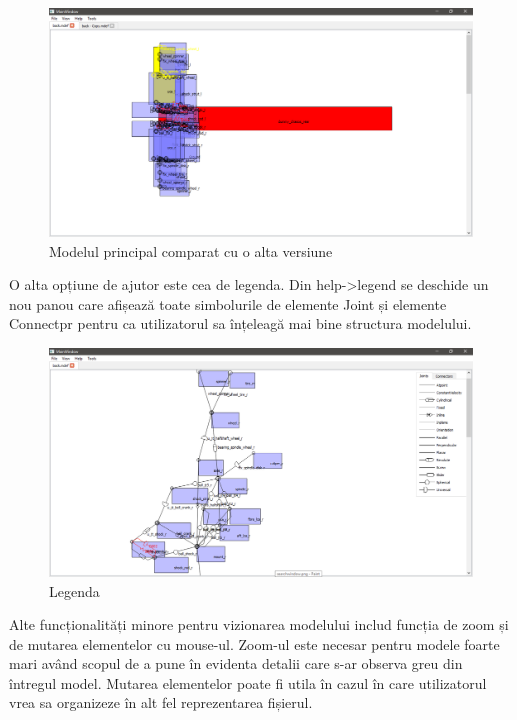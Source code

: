 \begin{figure}[H]
    \includegraphics[width=\linewidth]{imagini/implementare/compare.png}
    \caption{Modelul principal comparat cu o alta versiune}
    \label{fig:tabs}
\end{figure}

O alta opțiune de ajutor este cea de legenda. 
Din help->legend se deschide un nou panou care afișează toate simbolurile de elemente Joint și elemente Connectpr pentru ca 
utilizatorul sa înțeleagă mai bine structura modelului.\newline 

\begin{figure}[H]
    \includegraphics[width=\linewidth]{imagini/implementare/legend.png}
    \caption{Legenda}
    \label{fig:tabs}
\end{figure}

Alte funcționalități minore pentru vizionarea modelului includ funcția 
de zoom și de mutarea elementelor cu mouse-ul. Zoom-ul este necesar pentru modele foarte mari având scopul de a pune în evidenta 
detalii care s-ar observa greu din întregul model. Mutarea elementelor poate fi utila în cazul în care utilizatorul vrea sa 
organizeze în alt fel reprezentarea fișierul.\newline 

